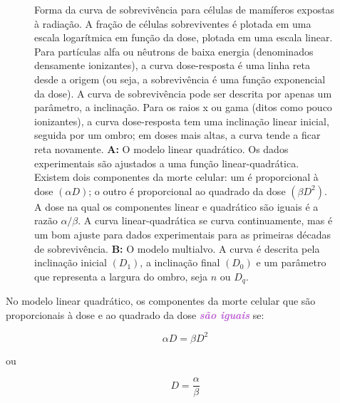 \documentclass[11pt,a4paper]{article}
\begin{document}
	\begin{figure}[h]
		\centering
		\caption{Forma da curva de sobrevivência para células de mamíferos expostas à radiação. A fração de células sobreviventes é plotada em uma escala logarítmica em função da dose, plotada em uma escala linear. Para partículas alfa ou nêutrons de baixa energia (denominados densamente ionizantes), a curva dose-resposta é uma linha reta desde a origem (ou seja, a sobrevivência é uma função exponencial da dose). A curva de sobrevivência pode ser descrita por apenas um parâmetro, a inclinação. Para os raios x ou gama (ditos como pouco ionizantes), a curva dose-resposta tem uma inclinação linear inicial, seguida por um ombro; em doses mais altas, a curva tende a ficar reta novamente. \textbf{A:} O modelo linear quadrático. Os dados experimentais são ajustados a uma função linear-quadrática. Existem dois componentes da morte celular: um é proporcional à dose $(\alpha D)$; o outro é proporcional ao quadrado da dose $(\beta D^2)$. A dose na qual os componentes linear e quadrático são iguais é a razão $\alpha/\beta$. A curva linear-quadrática se curva continuamente, mas é um bom ajuste para dados experimentais para as primeiras décadas de sobrevivência. \textbf{B:} O modelo multialvo. A curva é descrita pela inclinação inicial $(D_1)$, a inclinação final $(D_0)$ e um parâmetro que representa a largura do ombro, seja $n$ ou $D_q$.}
		\label{fig:fracaoSobrevivencia}
	\end{figure}

	No modelo linear quadrático, os componentes da morte celular que são proporcionais à dose e ao quadrado da dose \textcolor{MediumOrchid}{\textbf{\textit{são iguais}}} se:

	\begin{equation}
		\alpha D = \beta D^2
	\end{equation}

	ou

	\begin{equation}
		D = \frac{\alpha}{\beta}
	\end{equation}
\end{document}
